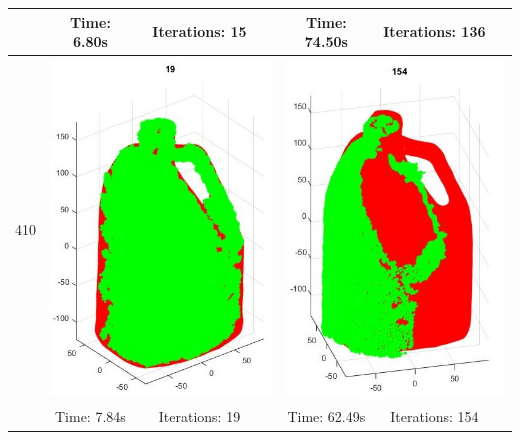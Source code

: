 \documentclass[letterpaper, 10 pt, conference]{ieeeconf}  %
\begin{document}
\begin{table}
\begin{tabular}{ccccccc}
 & Time: 6.80s & Iterations: 15 & & Time: 74.50s& Iterations: 136& \\ 
\midrule
410 & \multicolumn{3}{c}{\includegraphics[scale=0.43]{l410p.jpg}} & \multicolumn{3}{c}{\includegraphics[scale=0.43]{l410o.jpg}}\\ 
 & Time: 7.84s& Iterations: 19& & Time: 62.49s & Iterations: 154 & \\ 
\bottomrule
\end{tabular} 
\end{table}
\end{document}

